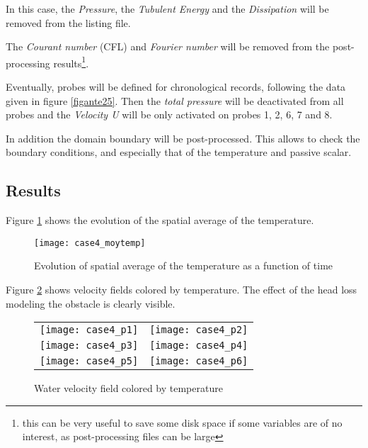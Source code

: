 In this case, the {\itshape Pressure}, the {\itshape Tubulent Energy} and the
{\itshape Dissipation} will be removed from the listing file.

The {\itshape Courant number} (CFL) and {\itshape Fourier number} will be
removed from the
post-processing results\footnote{this can be very useful to save some disk space
if some variables are of no interest, as post-processing files can be large}.

Eventually, probes will be defined for chronological records, following the data
given in figure \ref{figante25}. Then the {\itshape total pressure} will be
deactivated from all probes and the {\itshape Velocity U} will be only activated
on probes  1, 2, 6, 7 and 8.


In addition the domain boundary will be post-processed. This allows to check the
boundary conditions, and especially that of the temperature and passive scalar.



        \subsection{Results}
Figure \ref{fige2_e4} shows the evolution of the spatial average of the temperature.

\begin{figure}[h]
\begin{center}
\texttt{[image: case4\_moytemp]}
\caption{Evolution of spatial average of the temperature as a function of time}
\label{fige2_e4}
\end{center}
\end{figure}

Figure \ref{fige1_e4} shows velocity fields colored by temperature. The effect
of the head loss modeling the obstacle is clearly visible.

\begin{figure}
\begin{center}
\begin{tabular}{cc}
\texttt{[image: case4\_p1]} &
\texttt{[image: case4\_p2]} \\
\texttt{[image: case4\_p3]} &
\texttt{[image: case4\_p4]} \\
\texttt{[image: case4\_p5]} &
\texttt{[image: case4\_p6]} \\
\end{tabular}
\caption{Water velocity field colored by temperature}
\label{fige1_e4}
\end{center}
\end{figure}


